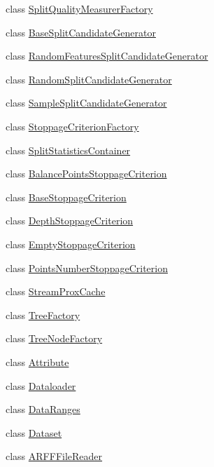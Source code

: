 \begin{DoxyCompactItemize}
\item 
class \hyperlink{classffactory_1_1_split_quality_measurer_factory}{Split\-Quality\-Measurer\-Factory}
\item 
class \hyperlink{classffactory_1_1_base_split_candidate_generator}{Base\-Split\-Candidate\-Generator}
\item 
class \hyperlink{classffactory_1_1_random_features_split_candidate_generator}{Random\-Features\-Split\-Candidate\-Generator}
\item 
class \hyperlink{classffactory_1_1_random_split_candidate_generator}{Random\-Split\-Candidate\-Generator}
\item 
class \hyperlink{classffactory_1_1_sample_split_candidate_generator}{Sample\-Split\-Candidate\-Generator}
\item 
class \hyperlink{classffactory_1_1_stoppage_criterion_factory}{Stoppage\-Criterion\-Factory}
\item 
class \hyperlink{classffactory_1_1_split_statistics_container}{Split\-Statistics\-Container}
\item 
class \hyperlink{classffactory_1_1_balance_points_stoppage_criterion}{Balance\-Points\-Stoppage\-Criterion}
\item 
class \hyperlink{classffactory_1_1_base_stoppage_criterion}{Base\-Stoppage\-Criterion}
\item 
class \hyperlink{classffactory_1_1_depth_stoppage_criterion}{Depth\-Stoppage\-Criterion}
\item 
class \hyperlink{classffactory_1_1_empty_stoppage_criterion}{Empty\-Stoppage\-Criterion}
\item 
class \hyperlink{classffactory_1_1_points_number_stoppage_criterion}{Points\-Number\-Stoppage\-Criterion}
\item 
class \hyperlink{classffactory_1_1_stream_prox_cache}{Stream\-Prox\-Cache}
\item 
class \hyperlink{classffactory_1_1_tree_factory}{Tree\-Factory}
\item 
class \hyperlink{classffactory_1_1_tree_node_factory}{Tree\-Node\-Factory}
\item 
class \hyperlink{classffactory_1_1_attribute}{Attribute}
\item 
class \hyperlink{classffactory_1_1_dataloader}{Dataloader}
\item 
class \hyperlink{classffactory_1_1_data_ranges}{Data\-Ranges}
\item 
class \hyperlink{classffactory_1_1_dataset}{Dataset}
\item 
class \hyperlink{classffactory_1_1_a_r_f_f_file_reader}{A\-R\-F\-F\-File\-Reader}

\end{DoxyCompactItemize}
